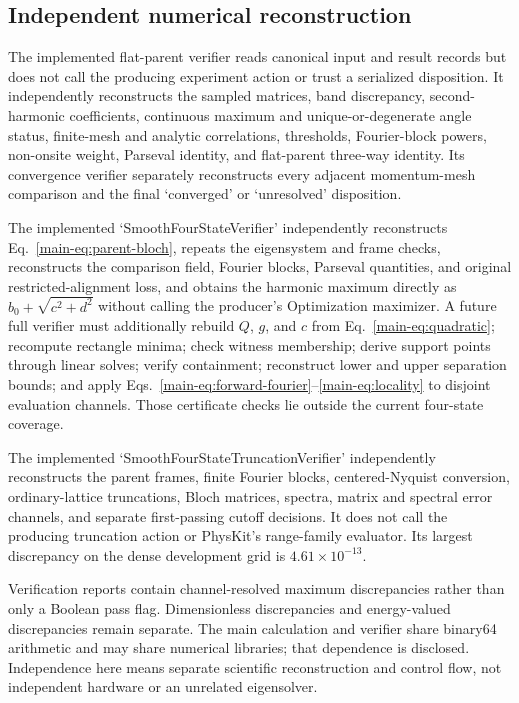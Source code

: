 \documentclass[11pt]{article}
\begin{document}
\subsection{Independent numerical reconstruction}

The implemented flat-parent verifier reads canonical input and result records but does
not call the producing experiment action or trust a serialized disposition. It
independently reconstructs the sampled matrices, band discrepancy, second-harmonic
coefficients, continuous maximum and unique-or-degenerate angle status, finite-mesh and
analytic correlations, thresholds, Fourier-block powers, non-onsite weight, Parseval
identity, and flat-parent three-way identity. Its convergence verifier separately
reconstructs every adjacent momentum-mesh comparison and the final `converged' or
`unresolved' disposition.

The implemented `SmoothFourStateVerifier' independently reconstructs
Eq.~\eqref{main-eq:parent-bloch}, repeats the eigensystem and frame checks, reconstructs the
comparison field, Fourier blocks, Parseval quantities, and original restricted-alignment
loss, and obtains the harmonic maximum directly as
$b_0+\sqrt{c^2+d^2}$ without calling the producer's Optimization maximizer. A future
full verifier must additionally rebuild $Q$, $g$, and $c$ from
Eq.~\eqref{main-eq:quadratic}; recompute rectangle minima; check witness membership; derive
support points through linear solves; verify containment; reconstruct lower and upper
separation bounds; and apply
Eqs.~\eqref{main-eq:forward-fourier}--\eqref{main-eq:locality} to disjoint evaluation channels.
Those certificate checks lie outside the current four-state coverage.

The implemented `SmoothFourStateTruncationVerifier' independently reconstructs the
parent frames, finite Fourier blocks, centered-Nyquist conversion, ordinary-lattice
truncations, Bloch matrices, spectra, matrix and spectral error channels, and separate
first-passing cutoff decisions. It does not call the producing truncation action or
PhysKit's range-family evaluator. Its largest discrepancy on the dense development grid
is $4.61\times10^{-13}$.

Verification reports contain channel-resolved maximum discrepancies rather than only a Boolean
pass flag. Dimensionless discrepancies and energy-valued discrepancies remain separate. The main
calculation and verifier share binary64 arithmetic and may share numerical libraries;
that dependence is disclosed. Independence here means separate scientific
reconstruction and control flow, not independent hardware or an unrelated eigensolver.
\end{document}

